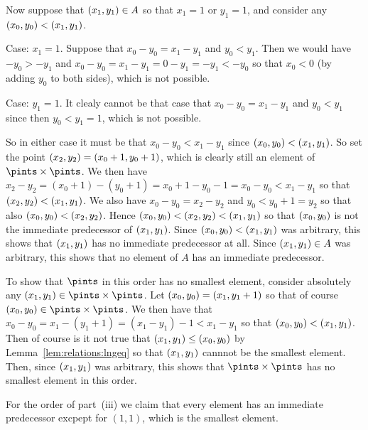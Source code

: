 {{    Now suppose that $(x_{1}, y_{1}) \in A$ so that $x_1 = 1$ or $y_1 = 1$, and consider any $(x_{0}, y_{0}) < (x_{1}, y_{1})$.

    Case: $x_1 = 1$.
    Suppose that $x_0-y_0 = x_1-y_1$ and $y_0 < y_1$.
    Then we would have $-y_0 > -y_1$ and $x_0-y_0 = x_1-y_1 = 0 - y_1 = -y_1 < -y_0$ so that $x_0 < 0$ (by adding $y_0$ to both sides), which is not possible.

    Case: $y_1 = 1$.
    It clealy cannot be that case that $x_0-y_0 = x_1-y_1$ and $y_0 < y_1$ since then $y_0 < y_1 = 1$, which is not possible.

    So in either case it must be that $x_0-y_0 < x_1-y_1$ since $(x_{0}, y_{0}) < (x_{1}, y_{1})$.
    So set the point $(x_{2}, y_{2}) = (x_0+1,y_0+1)$, which is clearly still an element of $\pintss$.
    We then have $x_2-y_2 = (x_0+1)-(y_0+1) = x_0+1-y_0-1 = x_0-y_0 < x_1-y_1$ so that $(x_{2}, y_{2}) < (x_{1}, y_{1})$.
    We also have $x_0-y_0 = x_2-y_2$ and $y_0 < y_0+1 = y_2$ so that also $(x_{0}, y_{0}) < (x_{2}, y_{2})$.
    Hence $(x_{0}, y_{0}) < (x_{2}, y_{2}) < (x_{1}, y_{1})$ so that $(x_{0}, y_{0})$ is not the immediate predecessor of $(x_{1}, y_{1})$.
    Since $(x_{0}, y_{0}) < (x_{1}, y_{1})$ was arbitrary, this shows that $(x_{1}, y_{1})$ has no immediate predecessor at all.
    Since $(x_{1}, y_{1}) \in A$ was arbitrary, this shows that no element of $A$ has an immediate predecessor.

    To show that $\pints$ in this order has no smallest element, consider absolutely any $\ppt{1} \in \pintss$.
    Let $(x_{0}, y_{0}) = (x_1,y_1+1)$ so that of course $\ppt{0} \in \pintss$.
    We then have that $x_0 - y_0 = x_1 - (y_1+1) = (x_1 - y_1) - 1 < x_1 - y_1$ so that $(x_{0}, y_{0}) < (x_{1}, y_{1})$.
    Then of course is it not true that $(x_{1}, y_{1}) \leq (x_{0}, y_{0})$ by Lemma~\ref{lem:relations:lngeq} so that $(x_{1}, y_{1})$ cannnot be the smallest element.
    Then, since $(x_{1}, y_{1})$ was arbitrary, this shows that $\pintss$ has no smallest element in this order.
  }

  For the order of part~(iii) we claim that every element has an immediate predecessor excpept for $(1,1)$, which is the smallest element.
  }
